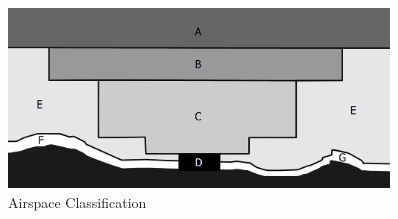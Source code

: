 






\begin{figure}[h]
    \centering
    \includegraphics[width=0.9\textwidth]{figures/classes.png}
    \caption{Airspace Classification \cite{nolan}}
    \label{fig:classes}
\end{figure}



